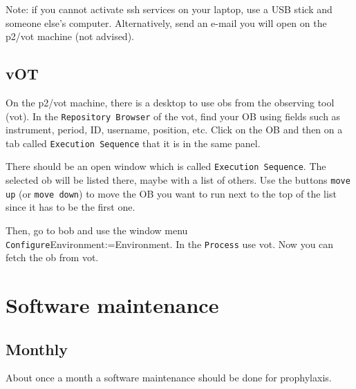 \documentclass[11pt,fleqn,a4paper]{book}
\makeatletter
\def\menu#1#2{\texttt{#1}\ifx{}#2\else\@for\@x:=#2\do{$\rightarrow$\texttt{\@x}}\fi}
\def\wmenu#1#2{window menu \menu{#1}{#2}}
\makeatother
\begin{document}
Note: if you cannot activate ssh services on your laptop, use a USB stick and someone else's computer.   Alternatively, send an e-mail you will open on the \gls{p2}/\gls{vot} machine (not advised). 

\section{vOT}

On the \gls{p2}/\gls{vot} machine, there is a \gls{desktop} to use \glspl{ob} from the observing tool (\gls{vot}). In the \texttt{Repository Browser} of the \gls{vot}, find your OB using fields such as instrument, period, ID, username, position, etc.  Click on the OB and then on a tab called \texttt{Execution Sequence} that it is in the same panel.

There should be an open window which is called \texttt{Execution Sequence}. The selected \gls{ob} will be listed there, maybe with a list of others. Use the buttons \texttt{move up} (or \texttt{move down})  to move the OB you want to run next to the top of the list since it has to be the first one.

Then, go to \gls{bob} and use the \wmenu{Configure}{Environment}. In the \texttt{Process} use \gls{vot}. Now you can fetch the \gls{ob} from \gls{vot}.




\chapter{Software maintenance}
\label{chap:reboots}

\section{Monthly}

About once a month a software maintenance should be done for prophylaxis.
\end{document}
